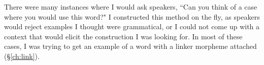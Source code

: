 There were many instances where I would ask speakers, ``Can you think of a case where you would use this word?" I constructed this method on the fly, as speakers would reject examples I thought were grammatical, or I could not come up with a context that would elicit the construction I was looking for. In most of these cases, I was trying to get an example of a word with a linker morpheme attached (\S\ref{ch:link}).



